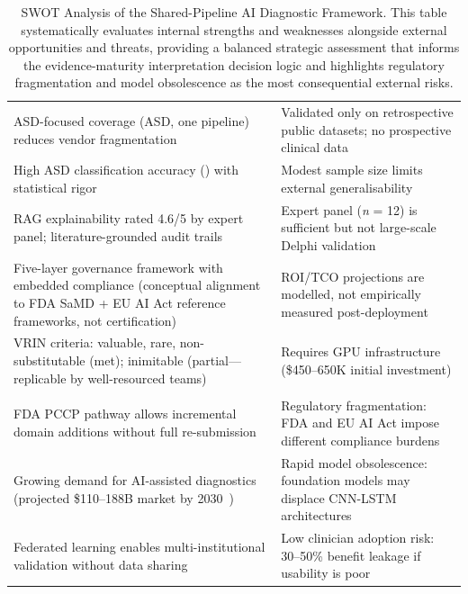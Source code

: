 \begin{table}[!htbp]
\tablestripes\tablefontsize
\tablefontsize
\caption[SWOT Analysis of the Shared-Pipeline AI Diagnostic]{SWOT Analysis of the Shared-Pipeline AI Diagnostic Framework. This table systematically evaluates internal strengths and weaknesses alongside external opportunities and threats, providing a balanced strategic assessment that informs the evidence-maturity interpretation decision logic and highlights regulatory fragmentation and model obsolescence as the most consequential external risks.}
\begin{tabularx}{\textwidth}{@{} L L @{}}
\toprule
{} &  \\
\midrule
ASD-focused coverage (ASD, one pipeline) reduces vendor fragmentation & Validated only on retrospective public datasets; no prospective clinical data \\
\addlinespace
High ASD classification accuracy (\asdacc{}) with statistical rigor & Modest sample size limits external generalisability \\
\addlinespace
RAG explainability rated 4.6/5 by expert panel; literature-grounded audit trails & Expert panel (\textit{n} = 12) is sufficient but not large-scale Delphi validation \\
\addlinespace
Five-layer governance framework with embedded compliance (conceptual alignment to FDA SaMD + EU AI Act reference frameworks, not certification) & ROI/TCO projections are modelled, not empirically measured post-deployment \\
\addlinespace
VRIN criteria: valuable, rare, non-substitutable (met); inimitable (partial---replicable by well-resourced teams) & Requires GPU infrastructure (\$450--650K initial investment) \\
\midrule
{} &  \\
\midrule
FDA PCCP pathway allows incremental domain additions without full re-submission & Regulatory fragmentation: FDA and EU AI Act impose different compliance burdens \\
\addlinespace
Growing demand for AI-assisted diagnostics (projected \$110--188B market by 2030~\cite{grandview2024aihealthcare}) & Rapid model obsolescence: foundation models may displace CNN-LSTM architectures \\
\addlinespace
Federated learning enables multi-institutional validation without data sharing & Low clinician adoption risk: 30--50\% benefit leakage if usability is poor \\

\end{tabularx}
\end{table}
